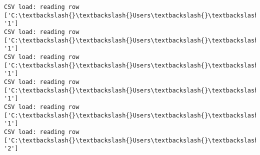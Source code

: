 \documentclass[11pt]{article}
\begin{document}
\begin{Verbatim}[commandchars=\\\{\}]
CSV load: reading row ['C:\textbackslash{}\textbackslash{}Users\textbackslash{}\textbackslash{}AbhishekGangadhar\textbackslash{}\textbackslash{}Downloads\textbackslash{}\textbackslash{}ActionRecog\textbackslash{}\textbackslash{}ActionRecog\textbackslash{}\textbackslash{}DataSets\textbackslash{}\textbackslash{}UCF11\textbackslash{}\textbackslash{}action\_youtube\_naudio\textbackslash{}\textbackslash{}golf\_swing\textbackslash{}\textbackslash{}v\_golf\_04\textbackslash{}\textbackslash{}v\_golf\_04\_06.avi', '1']
CSV load: reading row ['C:\textbackslash{}\textbackslash{}Users\textbackslash{}\textbackslash{}AbhishekGangadhar\textbackslash{}\textbackslash{}Downloads\textbackslash{}\textbackslash{}ActionRecog\textbackslash{}\textbackslash{}ActionRecog\textbackslash{}\textbackslash{}DataSets\textbackslash{}\textbackslash{}UCF11\textbackslash{}\textbackslash{}action\_youtube\_naudio\textbackslash{}\textbackslash{}golf\_swing\textbackslash{}\textbackslash{}v\_golf\_02\textbackslash{}\textbackslash{}v\_golf\_02\_01.avi', '1']
CSV load: reading row ['C:\textbackslash{}\textbackslash{}Users\textbackslash{}\textbackslash{}AbhishekGangadhar\textbackslash{}\textbackslash{}Downloads\textbackslash{}\textbackslash{}ActionRecog\textbackslash{}\textbackslash{}ActionRecog\textbackslash{}\textbackslash{}DataSets\textbackslash{}\textbackslash{}UCF11\textbackslash{}\textbackslash{}action\_youtube\_naudio\textbackslash{}\textbackslash{}golf\_swing\textbackslash{}\textbackslash{}v\_golf\_02\textbackslash{}\textbackslash{}v\_golf\_02\_02.avi', '1']
CSV load: reading row ['C:\textbackslash{}\textbackslash{}Users\textbackslash{}\textbackslash{}AbhishekGangadhar\textbackslash{}\textbackslash{}Downloads\textbackslash{}\textbackslash{}ActionRecog\textbackslash{}\textbackslash{}ActionRecog\textbackslash{}\textbackslash{}DataSets\textbackslash{}\textbackslash{}UCF11\textbackslash{}\textbackslash{}action\_youtube\_naudio\textbackslash{}\textbackslash{}golf\_swing\textbackslash{}\textbackslash{}v\_golf\_02\textbackslash{}\textbackslash{}v\_golf\_02\_03.avi', '1']
CSV load: reading row ['C:\textbackslash{}\textbackslash{}Users\textbackslash{}\textbackslash{}AbhishekGangadhar\textbackslash{}\textbackslash{}Downloads\textbackslash{}\textbackslash{}ActionRecog\textbackslash{}\textbackslash{}ActionRecog\textbackslash{}\textbackslash{}DataSets\textbackslash{}\textbackslash{}UCF11\textbackslash{}\textbackslash{}action\_youtube\_naudio\textbackslash{}\textbackslash{}golf\_swing\textbackslash{}\textbackslash{}v\_golf\_02\textbackslash{}\textbackslash{}v\_golf\_02\_04.avi', '1']
CSV load: reading row ['C:\textbackslash{}\textbackslash{}Users\textbackslash{}\textbackslash{}AbhishekGangadhar\textbackslash{}\textbackslash{}Downloads\textbackslash{}\textbackslash{}ActionRecog\textbackslash{}\textbackslash{}ActionRecog\textbackslash{}\textbackslash{}DataSets\textbackslash{}\textbackslash{}UCF11\textbackslash{}\textbackslash{}action\_youtube\_naudio\textbackslash{}\textbackslash{}trampoline\_jumping\textbackslash{}\textbackslash{}v\_jumping\_17\textbackslash{}\textbackslash{}v\_jumping\_17\_01.avi', '2']

\end{Verbatim}
\end{document}
